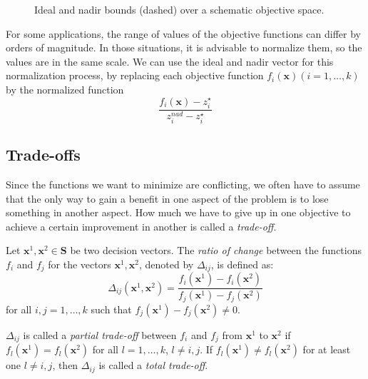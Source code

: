 \begin{figure}[h]
\caption{Ideal and nadir bounds (dashed) over a schematic objective space.}
\label{fig:nadir}
\end{figure}

For some applications, the range of values of the objective functions can differ by orders of magnitude. In those situations, it is advisable to normalize them, so the values are in the same scale. We can use the ideal and nadir vector for this normalization process, by replacing each objective function $f_i (\mathbf{x}) (i = 1, \ldots, k)$ by the normalized function
\[
\frac{f_i(\mathbf{x}) - z^\star_i}{z^{nad}_i - z^\star_i}
\]


\subsection{Trade-offs}
\label{sec:trade_offs}

Since the functions we want to minimize are conflicting, we often have to assume that the only way to gain a benefit in one aspect of the problem is to lose something in another aspect. How much we have to give up in one objective to achieve a certain improvement in another is called a \emph{trade-off}.

\begin{definition}
Let $\mathbf{x}^1, \mathbf{x}^2 \in \mathbf{S}$ be two decision vectors. The \emph{ratio of change} between the functions $f_i$ and $f_j$ for the vectors $\mathbf{x}^1, \mathbf{x}^2$, denoted by $\Delta_{ij}$, is defined as:
\[
\Delta_{ij} ( \mathbf{x}^1, \mathbf{x}^2 ) = \frac{f_i(\mathbf{x}^1) - f_i(\mathbf{x}^2)}{f_j(\mathbf{x}^1) - f_j(\mathbf{x}^2)}
\] 
for all $i, j = 1, \ldots, k$ such that $f_j(\mathbf{x}^1) - f_j(\mathbf{x}^2) \neq 0$.
\end{definition}

$\Delta_{ij}$ is called a \emph{partial trade-off} between $f_i$ and $f_j$ from $\mathbf{x}^1$ to $\mathbf{x}^2$ if $f_l(\mathbf{x}^1) = f_l(\mathbf{x}^2)$ for all $l = 1, \ldots, k$, $l \neq i, j$. If $f_l(\mathbf{x}^1) \neq f_l(\mathbf{x}^2)$ for at least one $l \neq i,j$, then $\Delta_{ij}$ is called a \emph{total trade-off}.

